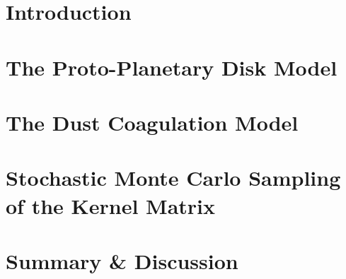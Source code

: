 \cleardoublepage\chapter{Introduction}
    \label{ch:introduction}
    

\cleardoublepage\chapter{The Proto-Planetary Disk Model}
    \label{ch:disk}
    
    

\cleardoublepage\chapter{The Dust Coagulation Model}
    \label{ch:smoluchoswki}
    

\cleardoublepage\chapter{Stochastic Monte Carlo Sampling of the Kernel Matrix}
    \label{ch:sampling}
    

%     

\cleardoublepage\chapter{Summary \& Discussion}
    \label{ch:discussion}
    
